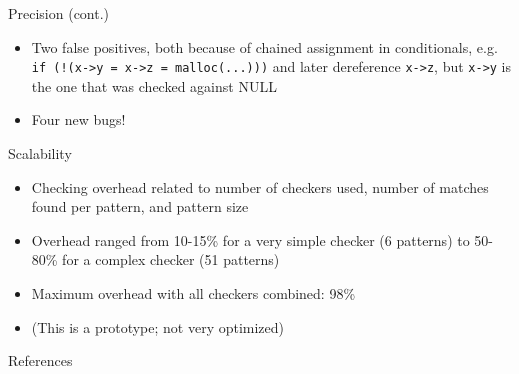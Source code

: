 \documentclass{beamer}
\begin{document}
\begin{frame}{Precision (cont.)}
\begin{itemize}
\item Two false positives, both because of chained assignment in
conditionals, e.g. {\tt if (!(x->y = x->z = malloc(...)))} and later
dereference {\tt x->z}, but {\tt x->y} is the one that was checked against
NULL
\item Four new bugs!
\end{itemize}
\end{frame}

\begin{frame}{Scalability}
\begin{itemize}
\item Checking overhead related to number of checkers used, number of
matches found per pattern, and pattern size
\item Overhead ranged from 10-15\% for a very simple checker (6 patterns)
to 50-80\% for a complex checker (51 patterns)
\item Maximum overhead with all checkers combined: 98\%
\item (This is a prototype; not very optimized)
\end{itemize}
\end{frame}

\begin{frame}{References}

{\footnotesize
}
\end{frame}
\end{document}
